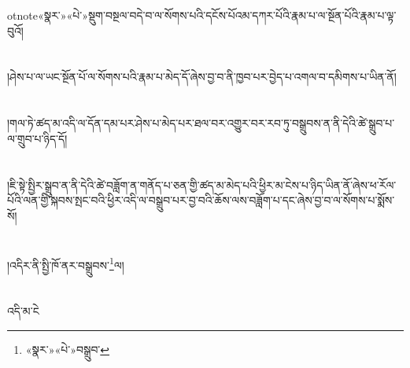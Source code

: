otnote{«སྣར་»«པེ་»སྡུག་བསྔལ་}བདེ་བ་ལ་སོགས་པའི་དངོས་པོའམ་དཀར་པོའི་རྣམ་པ་ལ་སྔོན་པོའི་རྣམ་པ་ལྟ་བུའོ།\chapter{ }།ཤེས་པ་ལ་ཡང་སྔོན་པོ་ལ་སོགས་པའི་རྣམ་པ་མེད་དོ་ཞེས་བྱ་བ་ནི་ཁྱབ་པར་བྱེད་པ་འགལ་བ་དམིགས་པ་ཡིན་ནོ།\chapter{ }།གལ་ཏེ་ཚད་མ་འདི་ལ་དོན་དམ་པར་ཤེས་པ་མེད་པར་ཐལ་བར་འགྱུར་བར་རབ་ཏུ་བསྒྲུབས་ན་ནི་དེའི་ཚེ་སྒྲུབ་པ་ལ་གྲུབ་པ་ཉིད་དོ།\chapter{ }།ཇི་སྟེ་སྤྱིར་སྒྲུབ་ན་ནི་དེའི་ཚེ་བཟློག་ན་གནོད་པ་ཅན་གྱི་ཚད་མ་མེད་པའི་ཕྱིར་མ་ངེས་པ་ཉིད་ཡིན་ནོ་ཞེས་ཕ་རོལ་པོའི་ལན་གྱི་སྐབས་སྤང་བའི་ཕྱིར་འདི་ལ་བསྒྲུབ་པར་བྱ་བའི་ཆོས་ལས་བཟློག་པ་དང་ཞེས་བྱ་བ་ལ་སོགས་པ་སྨོས་སོ།\chapter{ }།འདིར་ནི་སྤྱི་ཁོ་ནར་བསྒྲུབས་\footnote{«སྣར་»«པེ་»བསྒྲུབ་}ལ།\chapter{ }འདི་མ་ངེ